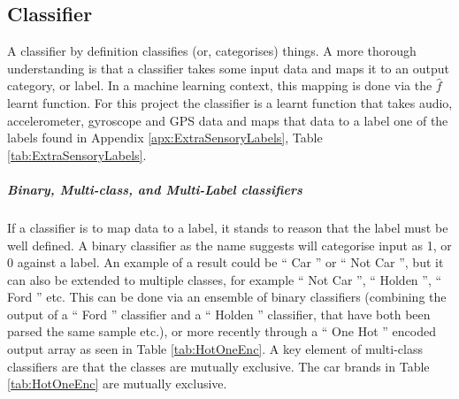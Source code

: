 \documentclass{UoNMCHA}
\newcommand{\inlineQuote}[1]{`` #1 ''}
\newcommand{\tref}[1] {Table \ref{#1}}
\newcommand{\aref}[1] {Appendix \ref{#1}}
\numberwithin{equation}{section}
\begin{document}




\subsection{Classifier}

A classifier by definition classifies (or, categorises) things. A more thorough understanding is that a classifier takes some input data and maps it to an output category, or label. In a machine learning context, this mapping is done via the $\hat{f}$ learnt function. For this project the classifier is a learnt function that takes audio, accelerometer, gyroscope and GPS data and maps that data to a label one of the labels found in \aref{apx:ExtraSensoryLabels}, \tref{tab:ExtraSensoryLabels}. 

\subparagraph{Binary, Multi-class, and  Multi-Label classifiers}
If a classifier is to map data to a label, it stands to reason that the label must be well defined. A binary classifier as the name suggests will categorise input as 1, or 0 against a label. An example of a result could be \inlineQuote{Car} or \inlineQuote{Not Car}, but it can also be extended to multiple classes, for example \inlineQuote{Not Car}, \inlineQuote{Holden}, \inlineQuote{Ford} etc. This can be done via an ensemble of binary classifiers (combining the output of a \inlineQuote{Ford} classifier and a \inlineQuote{Holden} classifier, that have both been parsed the same sample etc.), or more recently through a \inlineQuote{One Hot} \cite{huffman1954the} encoded output array as seen in \tref{tab:HotOneEnc}. A key element of multi-class classifiers are that the classes are mutually exclusive. The car brands in \tref{tab:HotOneEnc} are mutually exclusive.
\end{document}
